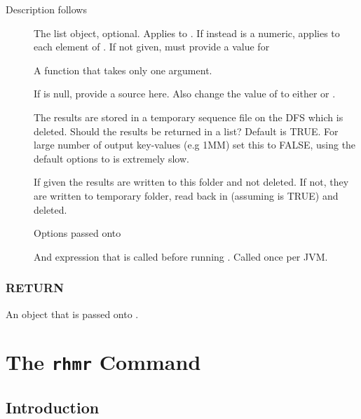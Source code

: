 \documentclass[letterpaper,10pt,english]{manual}
\begin{document}
Description follows
\begin{description}
\item[]
The list object, optional. Applies  to  .
If instead  is a numeric, applies  to each element of
. If not given, must provide a value for 

\item[]
A function that takes only one argument.

\item[]
If  is null, provide a source here. Also change the value of
 to either  or .

\item[]
The results are stored in a temporary sequence file on the DFS which is
deleted. Should the results be returned in a list? Default is TRUE. For
large number of output key-values (e.g 1MM) set this to FALSE, using the
default options to  is extremely slow.

\item[]
If given the results are written to this folder and not deleted. If not,
they are written to temporary folder, read back in (assuming 
is TRUE) and deleted.

\item[]
Options passed onto 

\item[]
And expression that is called before running . Called once per
JVM.

\end{description}


\subsection{RETURN}

An object that is passed onto .

\resetcurrentobjects
\hypertarget{--doc-rhmr}{}

\chapter{The \texttt{rhmr} Command}


\section{Introduction}
\end{document}
